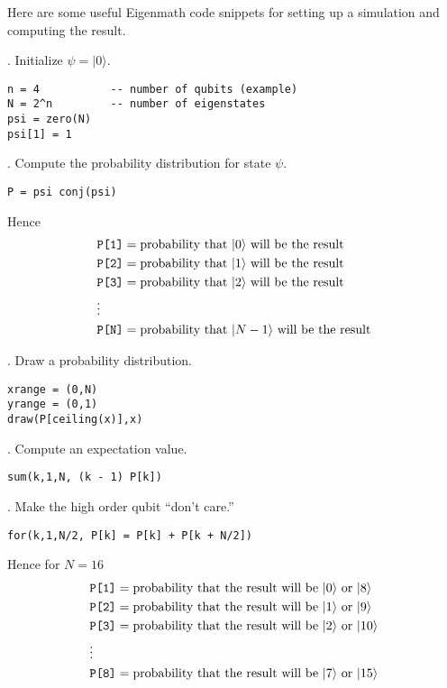 \bigskip
\noindent
Here are some useful Eigenmath code snippets for setting up a simulation
and computing the result.

\bigskip
{}. Initialize $\psi=|0\rangle$.
{\color{blue}
\begin{verbatim}
n = 4           -- number of qubits (example)
N = 2^n         -- number of eigenstates
psi = zero(N)
psi[1] = 1
\end{verbatim}}

. Compute the probability distribution for state $\psi$.
{\color{blue}
\begin{verbatim}
P = psi conj(psi)
\end{verbatim}}

\noindent
Hence
\begin{align*}
&\text{\tt P[1]}=\text{probability that $|0\rangle$ will be the result}
\\
&\text{\tt P[2]}=\text{probability that $|1\rangle$ will be the result}
\\
&\text{\tt P[3]}=\text{probability that $|2\rangle$ will be the result}
\\
&\vdots
\\
&\text{\tt P[N]}=\text{probability that $|N-1\rangle$ will be the result}
\end{align*}

. Draw a probability distribution.
{\color{blue}
\begin{verbatim}
xrange = (0,N)
yrange = (0,1)
draw(P[ceiling(x)],x)
\end{verbatim}}

. Compute an expectation value.
{\color{blue}
\begin{verbatim}
sum(k,1,N, (k - 1) P[k])
\end{verbatim}}

. Make the high order qubit ``don't care.''
{\color{blue}
\begin{verbatim}
for(k,1,N/2, P[k] = P[k] + P[k + N/2])
\end{verbatim}}

\noindent
Hence for $N=16$
\begin{align*}
&\text{\tt P[1]}=\text{probability that the result will be $|0\rangle$ or $|8\rangle$}
\\
&\text{\tt P[2]}=\text{probability that the result will be $|1\rangle$ or $|9\rangle$}
\\
&\text{\tt P[3]}=\text{probability that the result will be $|2\rangle$ or $|10\rangle$}
\\
&\vdots
\\
&\text{\tt P[8]}=\text{probability that the result will be $|7\rangle$ or $|15\rangle$}
\end{align*}

